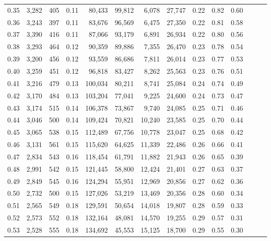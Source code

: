 \begin{tabular}{rrrrrrrrrrrrrr}
0.35 &  3,282 &    405 &  0.11 &   80,433 &   99,812 &   6,078 &  27,747 &  0.22 &  0.82 &      0.60 \\
0.36 &  3,243 &    397 &  0.11 &   83,676 &   96,569 &   6,475 &  27,350 &  0.22 &  0.81 &      0.58 \\
0.37 &  3,390 &    416 &  0.11 &   87,066 &   93,179 &   6,891 &  26,934 &  0.22 &  0.80 &      0.56 \\
0.38 &  3,293 &    464 &  0.12 &   90,359 &   89,886 &   7,355 &  26,470 &  0.23 &  0.78 &      0.54 \\
0.39 &  3,200 &    456 &  0.12 &   93,559 &   86,686 &   7,811 &  26,014 &  0.23 &  0.77 &      0.53 \\
0.40 &  3,259 &    451 &  0.12 &   96,818 &   83,427 &   8,262 &  25,563 &  0.23 &  0.76 &      0.51 \\
0.41 &  3,216 &    479 &  0.13 &  100,034 &   80,211 &   8,741 &  25,084 &  0.24 &  0.74 &      0.49 \\
0.42 &  3,170 &    484 &  0.13 &  103,204 &   77,041 &   9,225 &  24,600 &  0.24 &  0.73 &      0.47 \\
0.43 &  3,174 &    515 &  0.14 &  106,378 &   73,867 &   9,740 &  24,085 &  0.25 &  0.71 &      0.46 \\
0.44 &  3,046 &    500 &  0.14 &  109,424 &   70,821 &  10,240 &  23,585 &  0.25 &  0.70 &      0.44 \\
0.45 &  3,065 &    538 &  0.15 &  112,489 &   67,756 &  10,778 &  23,047 &  0.25 &  0.68 &      0.42 \\
0.46 &  3,131 &    561 &  0.15 &  115,620 &   64,625 &  11,339 &  22,486 &  0.26 &  0.66 &      0.41 \\
0.47 &  2,834 &    543 &  0.16 &  118,454 &   61,791 &  11,882 &  21,943 &  0.26 &  0.65 &      0.39 \\
0.48 &  2,991 &    542 &  0.15 &  121,445 &   58,800 &  12,424 &  21,401 &  0.27 &  0.63 &      0.37 \\
0.49 &  2,849 &    545 &  0.16 &  124,294 &   55,951 &  12,969 &  20,856 &  0.27 &  0.62 &      0.36 \\
0.50 &  2,732 &    500 &  0.15 &  127,026 &   53,219 &  13,469 &  20,356 &  0.28 &  0.60 &      0.34 \\
0.51 &  2,565 &    549 &  0.18 &  129,591 &   50,654 &  14,018 &  19,807 &  0.28 &  0.59 &      0.33 \\
0.52 &  2,573 &    552 &  0.18 &  132,164 &   48,081 &  14,570 &  19,255 &  0.29 &  0.57 &      0.31 \\
0.53 &  2,528 &    555 &  0.18 &  134,692 &   45,553 &  15,125 &  18,700 &  0.29 &  0.55 &      0.30 \\

\end{tabular}
